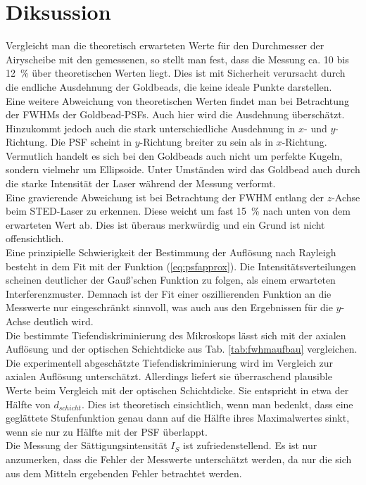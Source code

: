 \section{Diksussion}
Vergleicht man die theoretisch erwarteten Werte für den Durchmesser der Airyscheibe mit den gemessenen, so stellt man fest, dass die Messung ca. 10 bis 12~\% über theoretischen Werten liegt.
Dies ist mit Sicherheit verursacht durch die endliche Ausdehnung der Goldbeads, die keine ideale Punkte darstellen.
\\
Eine weitere Abweichung von theoretischen Werten findet man bei Betrachtung der FWHMs der Goldbead-PSFs. Auch hier wird die Ausdehnung überschätzt. 
Hinzukommt jedoch auch die stark unterschiedliche Ausdehnung in $x$- und $y$-Richtung. 
Die PSF scheint in $y$-Richtung breiter zu sein als in $x$-Richtung. 
Vermutlich handelt es sich bei den Goldbeads auch nicht um perfekte Kugeln, sondern vielmehr um Ellipsoide. Unter Umständen wird das Goldbead auch durch die starke Intensität der Laser während der Messung verformt.
\\
Eine gravierende Abweichung ist bei Betrachtung der FWHM entlang der $z$-Achse beim STED-Laser zu erkennen.
Diese weicht um fast 15~\% nach unten von dem erwarteten Wert ab. Dies ist überaus merkwürdig und ein Grund ist nicht offensichtlich.
\\
Eine prinzipielle Schwierigkeit der Bestimmung der Auflösung nach Rayleigh besteht in dem Fit mit der Funktion (\ref{eq:psfapprox}).
Die Intensitätsverteilungen scheinen deutlicher der Gauß'schen Funktion zu folgen, als einem erwarteten Interferenzmuster. 
Demnach ist der Fit einer oszillierenden Funktion an die Messwerte nur eingeschränkt sinnvoll, was auch aus den Ergebnissen für die $y$-Achse deutlich wird.
\\
Die bestimmte Tiefendiskriminierung des Mikroskops lässt sich mit der axialen Auflösung und der optischen Schichtdicke aus Tab. \ref{tab:fwhmaufbau} vergleichen. 
Die experimentell abgeschätzte Tiefendiskriminierung wird im Vergleich zur axialen Auflösung unterschätzt. 
Allerdings liefert sie überraschend plausible Werte beim Vergleich mit der optischen Schichtdicke.
Sie entspricht in etwa der Hälfte von $d_{schicht}$. Dies ist theoretisch einsichtlich, wenn man bedenkt, dass eine geglättete Stufenfunktion genau dann auf die Hälfte ihres Maximalwertes sinkt, wenn sie nur zu Hälfte mit der PSF überlappt. 
\\
Die Messung der Sättigungsintensität $I_S$ ist zufriedenstellend. Es ist nur anzumerken, dass die Fehler der Messwerte unterschätzt werden, da nur die sich aus dem Mitteln ergebenden Fehler betrachtet werden. 
